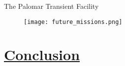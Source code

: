 \documentclass[12pt]{article} %
\numberwithin{equation}{section} %
\begin{document}
The Palomar Transient Facility

\begin{figure}[H]
\centering
\texttt{[image: future\_missions.png]}
\caption{}
\label{fig: future_missions}
\end{figure}





\section[Conclusion]{\hyperlink{toc}{Conclusion}}


\appendix


\newpage

\printindex



\end{document}
